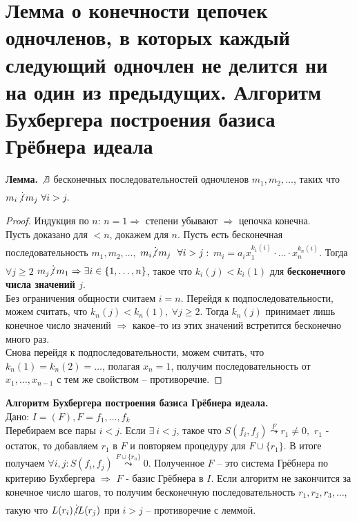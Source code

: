 \section{Лемма о конечности цепочек одночленов, в которых каждый следующий одночлен не делится ни на один из предыдущих. Алгоритм Бухбергера построения базиса Грёбнера идеала}

\textbf{Лемма.} $\not\exists$ бесконечных последовательностей одночленов $m_1, m_2, \dotsc$, таких что $m_i\!\not\vdots\, m_j\ \forall i > j.$
\begin{proof}
    Индукция по $n$: $n=1 \Rightarrow$ степени убывают $\Rightarrow$ цепочка конечна.\\
    Пусть доказано для $<n$, докажем для $n$. Пусть есть бесконечная последовательность $m_1, m_2, \dotsc,$ $m_i \!\!\not\vdots\, m_j\ \ \forall i > j:$ $m_i = a_i x_1^{k_1(i)}\cdot \dotsc \cdot x_n^{k_n(i)}$.
    Тогда $\forall j \geq 2$ $m_j \!\!\not\vdots\, m_1 \Rightarrow \exists i \in \{1, \dotsc, n\}$, такое что $k_i(j) < k_i(1)$ для \textbf{бесконечного числа значений $j$}. 
    \\Без ограничения общности считаем $i = n$. Перейдя к подпоследовательности, можем считать, что $k_n(j) < k_n(1), \ \forall j \geq 2$. Тогда $k_n(j)$ принимает лишь конечное число значений $\Rightarrow$ какое--то из этих значений встретится бесконечно много раз. 
    \\Снова перейдя к подпоследовательности, можем считать, что $k_n(1) = k_n(2) = \dotsc$, полагая $x_n = 1$, получим последовательность от $x_1, \dots, x_{n-1}$ с тем же свойством  -- противоречие.
\end{proof}
\noindent\textbf{Алгоритм Бухбергера построения базиса Грёбнера идеала.}
\\Дано: $I = (F), F={f_1, \dotsc, f_k}$\\
Перебираем все пары $i < j$. Если  $\exists\ i < j$, такое что $S(f_i, f_j) \overset{F}{\leadsto} r_1 \neq 0,$ $r_1$ - остаток, то добавляем $r_1$ в $F$ и повторяем процедуру для $F \cup \{r_1\}$. В итоге получаем $\forall i, j: S(f_i, f_j) \overset{F \cup \{r_n\}}{\leadsto} 0$. Полученное $F$ -- это система Грёбнера по критерию Бухбергера $\Rightarrow$ $F$ - базис Грёбнера в $I$. Если алгоритм не закончится за конечное число шагов, то получим бесконечную последовательность $r_1, r_2, r_3, \dotsc$, такую что $L(r_i) \!\!\not\vdots L(r_j)$ при $i > j$ -- противоречие с леммой.